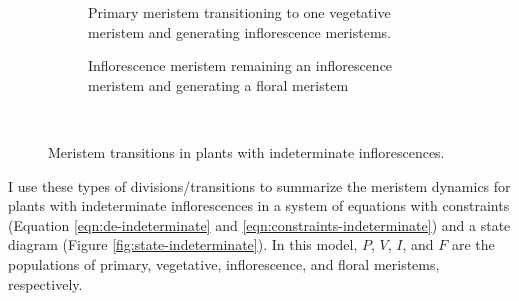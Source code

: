 \documentclass[12pt, oneside,titlepage]{article}   	%
\begin{document}
\begin{figure}[hbt!]
\begin{subfigure}[h]{.2\textwidth}
          \caption{Primary meristem transitioning to one vegetative meristem and generating inflorescence meristems.} 
  \end{subfigure} 
            \hspace{\fill}
  \begin{subfigure}[h]{.2\textwidth}
    \centering
    \centering

    \caption{Inflorescence meristem remaining an inflorescence meristem and generating a floral meristem}
  \end{subfigure}\
        \caption{Meristem transitions in plants with indeterminate inflorescences.}
\end{figure}

I use these types of divisions/transitions to summarize the meristem dynamics for plants with indeterminate inflorescences in a system of equations with constraints (Equation \ref{eqn:de-indeterminate} and \ref{eqn:constraints-indeterminate}) and a state diagram (Figure \ref{fig:state-indeterminate}). In this model, $P$, $V$, $I$, and $F$ are the populations of primary, vegetative, inflorescence, and floral meristems, respectively. 
\end{document}
